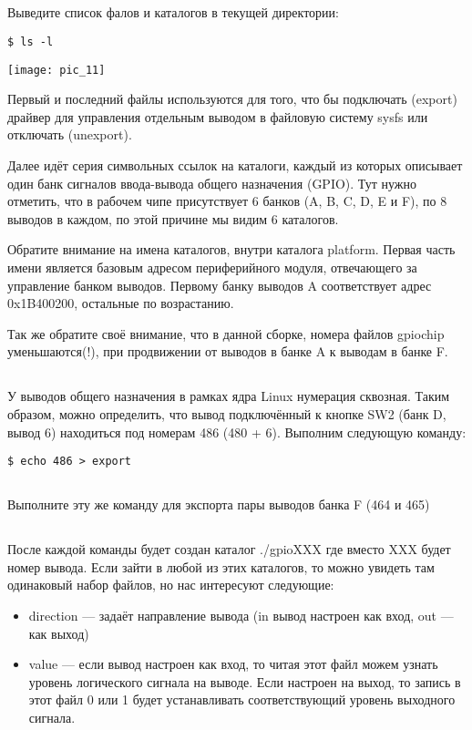 \subsection{}Выведите список фалов и каталогов в текущей директории: 
\begin{lstlisting}[style=bash]
$ ls -l
\end{lstlisting}
\begin{center}
	\texttt{[image: pic\_11]}
\end{center}

Первый и последний файлы используются для того, что бы подключать (export) драйвер для управления отдельным выводом в файловую систему sysfs или отключать (unexport). 

Далее идёт серия символьных ссылок на каталоги, каждый из которых описывает один банк сигналов ввода-вывода общего назначения (GPIO). Тут нужно отметить, что в рабочем чипе присутствует 6 банков (A, B, C, D, E и F), по 8 выводов в каждом, по этой причине мы видим 6 каталогов.  

Обратите внимание на имена каталогов, внутри каталога platform. Первая часть имени является базовым адресом периферийного модуля, отвечающего за управление банком выводов. Первому банку выводов A соответствует адрес 0x1B400200, остальные по возрастанию. 

Так же обратите своё внимание, что в данной сборке, номера файлов gpiochip уменьшаются(!), при продвижении от выводов в банке A к выводам в банке F.

\subsection{}У выводов общего назначения в рамках ядра Linux нумерация сквозная. Таким образом, можно определить, что вывод подключённый к кнопке SW2 (банк D, вывод 6) находиться под номерам 486 (480 + 6).  Выполним следующую команду:
\begin{lstlisting}[style=bash]
$ echo 486 > export
\end{lstlisting}

\subsection{}Выполните эту же команду для экспорта пары выводов банка F (464 и 465) 

\subsection{}После каждой команды будет создан каталог ./gpioXXX где вместо XXX будет номер вывода. Если зайти в любой из этих каталогов, то можно увидеть там одинаковый набор файлов, но нас интересуют следующие: 
\begin{itemize}
\item direction — задаёт направление вывода (in вывод настроен как вход, out — как выход)
\item value — если вывод настроен как вход, то читая этот файл можем узнать уровень логического сигнала на выводе. Если настроен на выход, то запись в этот файл 0 или 1 будет устанавливать соответствующий уровень выходного сигнала.
\end{itemize}

